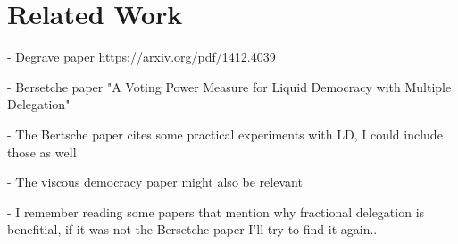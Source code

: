 
\chapter{Related Work}

- Degrave paper https://arxiv.org/pdf/1412.4039

- Bersetche paper "A Voting Power Measure for Liquid Democracy with Multiple Delegation"

- The Bertsche paper cites some practical experiments with LD, I could include those as well

- The viscous democracy paper might also be relevant

- I remember reading some papers that mention why fractional delegation is benefitial, if it was not the Bersetche paper I'll try to find it again..

